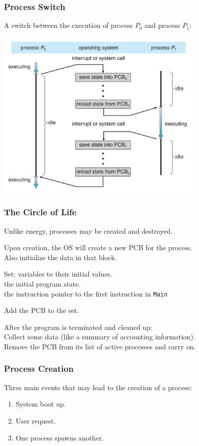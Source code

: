 \begin{frame}
\frametitle{Process Switch}

A switch between the execution of process $P_{0}$ and process $P_{1}$:

\begin{center}
\includegraphics[width=0.75\textwidth]{images/process-switch.png}
\end{center}

\end{frame}


\begin{frame}
\frametitle{The Circle of Life}


Unlike energy, processes may be created and destroyed. 

Upon creation, the OS will create a new PCB for the process.\\
\quad Also initialize the data in that block. 

Set: variables to their initial values.\\
\quad the initial program state.\\
\quad the instruction pointer to the first instruction in \texttt{Main}

Add the PCB to the set.

After the program is terminated and cleaned up:\\
\quad Collect some data (like a summary of accounting information).\\
\quad Remove the PCB from its list of active processes and carry on.


\end{frame}

\begin{frame}
\frametitle{Process Creation}

Three main events that may lead to the creation of a process:

\begin{enumerate}
	\item System boot up.
	\item User request.
	\item One process spawns another.
\end{enumerate}


\end{frame}


